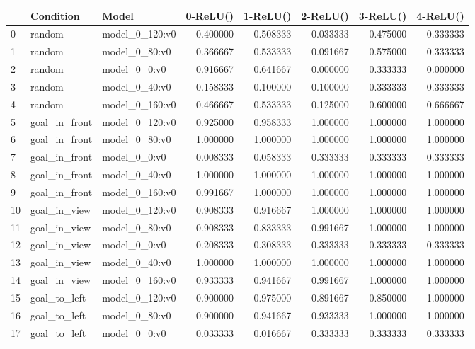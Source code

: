 \begin{tabular}{lllrrrrr}
\toprule
 & Condition & Model & 0-ReLU() & 1-ReLU() & 2-ReLU() & 3-ReLU() & 4-ReLU() \\
\midrule
0 & random & model\_0\_120:v0 & 0.400000 & 0.508333 & 0.033333 & 0.475000 & 0.333333 \\
1 & random & model\_0\_80:v0 & 0.366667 & 0.533333 & 0.091667 & 0.575000 & 0.333333 \\
2 & random & model\_0\_0:v0 & 0.916667 & 0.641667 & 0.000000 & 0.333333 & 0.000000 \\
3 & random & model\_0\_40:v0 & 0.158333 & 0.100000 & 0.100000 & 0.333333 & 0.333333 \\
4 & random & model\_0\_160:v0 & 0.466667 & 0.533333 & 0.125000 & 0.600000 & 0.666667 \\
5 & goal\_in\_front & model\_0\_120:v0 & 0.925000 & 0.958333 & 1.000000 & 1.000000 & 1.000000 \\
6 & goal\_in\_front & model\_0\_80:v0 & 1.000000 & 1.000000 & 1.000000 & 1.000000 & 1.000000 \\
7 & goal\_in\_front & model\_0\_0:v0 & 0.008333 & 0.058333 & 0.333333 & 0.333333 & 0.333333 \\
8 & goal\_in\_front & model\_0\_40:v0 & 1.000000 & 1.000000 & 1.000000 & 1.000000 & 1.000000 \\
9 & goal\_in\_front & model\_0\_160:v0 & 0.991667 & 1.000000 & 1.000000 & 1.000000 & 1.000000 \\
10 & goal\_in\_view & model\_0\_120:v0 & 0.908333 & 0.916667 & 1.000000 & 1.000000 & 1.000000 \\
11 & goal\_in\_view & model\_0\_80:v0 & 0.908333 & 0.833333 & 0.991667 & 1.000000 & 1.000000 \\
12 & goal\_in\_view & model\_0\_0:v0 & 0.208333 & 0.308333 & 0.333333 & 0.333333 & 0.333333 \\
13 & goal\_in\_view & model\_0\_40:v0 & 1.000000 & 1.000000 & 1.000000 & 1.000000 & 1.000000 \\
14 & goal\_in\_view & model\_0\_160:v0 & 0.933333 & 0.941667 & 0.991667 & 1.000000 & 1.000000 \\
15 & goal\_to\_left & model\_0\_120:v0 & 0.900000 & 0.975000 & 0.891667 & 0.850000 & 1.000000 \\
16 & goal\_to\_left & model\_0\_80:v0 & 0.900000 & 0.941667 & 0.933333 & 1.000000 & 1.000000 \\
17 & goal\_to\_left & model\_0\_0:v0 & 0.033333 & 0.016667 & 0.333333 & 0.333333 & 0.333333 \\

\end{tabular}
